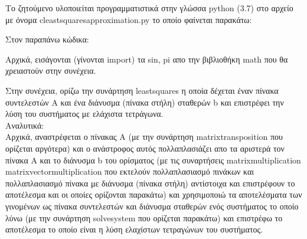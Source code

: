 \documentclass[a4paper,11pt]{article}
\newcommand{\lt}{\latintext}
\newcommand{\gt}{\greektext}
\begin{document}
Το ζητούμενο υλοποιείται προγραμματιστικά στην γλώσσα {\lt python} (3.7) στο αρχείο με όνομα {\lt c\textunderscore least\textunderscore squares\textunderscore approximation.py} το οποίο φαίνεται παρακάτω:
\lt

\gt

\par
Στον παραπάνω κώδικα:\\
\par
Αρχικά, εισάγονται (γίνονται {\lt import}) τα {\lt sin, pi} απο την βιβλιοθήκη {\lt math} που θα χρειαστούν στην συνέχεια.\\

\par
Στην συνέχεια, ορίζω την συνάρτηση {\lt least\textunderscore squares} η οποία δέχεται έναν πίνακα συντελεστών {\lt A} και ένα διάνυσμα (πίνακα στήλη) σταθερών {\lt b} και επιστρέφει την λύση του συστήματος με ελάχιστα τετράγωνα.\\
Αναλυτικά:\\
Αρχικά, αναστρέφεται ο πίνακας Α (με την συνάρτηση {\lt matrix\textunderscore transposition} που ορίζεται αργότερα) και ο ανάστροφος αυτός πολλαπλασιάζει απο τα αριστερά τον πίνακα {\lt A} και το διάνυσμα {\lt b} του ορίσματος (με τις συναρτήσεις {\lt matrix\textunderscore multiplication} {\lt matrix\textunderscore vector\textunderscore multiplication} που εκτελούν πολλαπλασιασμό πινάκων και πολλαπλασιασμό πίνακα με διάνυσμα (πίνακα στήλη) αντίστοιχα και επιστρέφουν το αποτέλεσμα και οι οποίες ορίζονται παρακάτω) και χρησιμοποιώ τα αποτελέσματα των γινομένων ως πίνακα συντελεστών και διάνυσμα σταθερών ενός συστήματος το οποίο λύνω (με την συνάρτηση {\lt solve\textunderscore system} που ορίζεται παρακάτω) και επιστρέφω το αποτέλεσμα το οποίο είναι η λύση ελαχίστων τετραγώνων του συστήματος.\\
\end{document}
